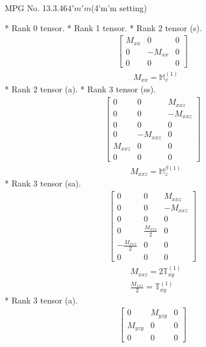 \documentclass[fleqn,8pt,landscape]{jsarticle}
\begin{document}
\setcounter{MaxMatrixCols}{32}

\renewcommand{\tablename}{Table~}
\renewcommand{\figurename}{Figure~}
\begin{center}
\LARGE
MPG No. 13.3.46\quad$4'm'm$\quad(4'm'm setting)
\end{center}
* Rank 0 tensor.
* Rank 1 tensor.
* Rank 2 tensor (s).
\begin{align*}
\begin{bmatrix} M_{xx} & 0 & 0 \\ 0 & - M_{xx} & 0 \\ 0 & 0 & 0 \end{bmatrix}
\end{align*}
\begin{align*}
& M_{xx} = \mathbb{M}_{v}^{(1)}
\end{align*}
* Rank 2 tensor (a).
* Rank 3 tensor (ss).
\begin{align*}
\begin{bmatrix} 0 & 0 & M_{xxz} \\ 0 & 0 & - M_{xxz} \\ 0 & 0 & 0 \\ 0 & - M_{xxz} & 0 \\ M_{xxz} & 0 & 0 \\ 0 & 0 & 0 \end{bmatrix}
\end{align*}
\begin{align*}
& M_{xxz} = \mathbb{M}_{z}^{\beta(1)}
\end{align*}
* Rank 3 tensor (sa).
\begin{align*}
\begin{bmatrix} 0 & 0 & M_{xxz} \\ 0 & 0 & - M_{xxz} \\ 0 & 0 & 0 \\ 0 & \frac{M_{xxz}}{2} & 0 \\ - \frac{M_{xxz}}{2} & 0 & 0 \\ 0 & 0 & 0 \end{bmatrix}
\end{align*}
\begin{align*}
& M_{xxz} = 2 \mathbb{T}_{xy}^{(1)} \\
& \frac{M_{xxz}}{2} = \mathbb{T}_{xy}^{(1)}
\end{align*}
* Rank 3 tensor (a).
\begin{align*}
\begin{bmatrix} 0 & M_{yzy} & 0 \\ M_{yzy} & 0 & 0 \\ 0 & 0 & 0 \end{bmatrix}
\end{align*}
\end{document}
